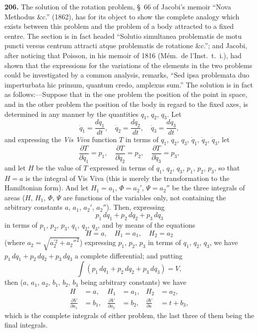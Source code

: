 \documentclass[11pt,a4paper]{book}
\begin{document}
\noindent\textbf{206.} The solution of the rotation problem, \S~66 of Jacobi's memoir ``Nova Methodus \&c.'' (1862), has for its object to show the complete analogy which exists between this problem and the problem of a body attracted to a fixed centre. The section is in fact headed ``Solutio simultanea problematis de motu puncti versus centrum attracti atque problematis de rotatione \&c.''; and Jacobi, after noticing that Poisson, in his memoir of 1816 (M\'{e}m.~de l'Inst.~t.~i.), had shown that the expressions for the variations of the elements in the two problems could be investigated by a common analysis, remarks, ``Sed ipsa problemata duo imperturbata hic primum, quantum credo, amplexus sum.'' The solution is in fact as follows:---Suppose that in the one problem the position of the point in space, and in the other problem the position of the body in regard to the fixed axes, is determined in any manner by the quantities $q_1$, $q_2$, $q_3$. Let
\[
\dot{q}_1 = \frac{dq_1}{dt},\quad \dot{q}_2 = \frac{dq_2}{dt},\quad \dot{q}_3 = \frac{dq_3}{dt},
\]
and expressing the \textit{Vis Viva} function $T$ in terms of $q_1$, $q_2$, $q_3$, $\dot{q}_1$, $\dot{q}_2$, $\dot{q}_3$, let
\[
\frac{\partial T}{\partial \dot{q}_1} = p_1,\quad \frac{\partial T}{\partial \dot{q}_2} = p_2,\quad \frac{\partial T}{\partial \dot{q}_3} = p_3,
\]
and let $H$ be the value of $T$ expressed in terms of $q_1$, $q_2$, $q_3$, $p_1$, $p_2$, $p_3$, so that $H = a$ is the integral of Vis Viva (this is merely the transformation to the Hamiltonian form). And let $H_1 = a_1$, $\Phi = a_2'$, $\Psi = a_2''$ be the three integrals of areas ($H$, $H_1$, $\Phi$, $\Psi$ are functions of the variables only, not containing the arbitrary constants $a$, $a_1$, $a_2'$, $a_2''$). Then, expressing
\[
p_1\,dq_1 + p_2\,dq_2 + p_3\,dq_3
\]
in terms of $p_1$, $p_2$, $p_3$, $q_1$, $q_2$, $q_3$, and by means of the equations
\[
H = a,\quad H_1 = a_1,\quad H_2 = a_2
\]
(where $a_2 = \sqrt{a_2^{'2} + a_2''^{2}}$) expressing $p_1$, $p_2$, $p_3$ in terms of $q_1$, $q_2$, $q_3$, we have $p_1\,dq_1 + p_2\,dq_2 + p_3\,dq_3$ a complete differential; and putting
\[
\int (p_1\,dq_1 + p_2\,dq_2 + p_3\,dq_3) = V,
\]
then ($a$, $a_1$, $a_2$, $b_1$, $b_2$, $b_3$ being arbitrary constants) we have
\begin{align*}
H &= a, & H_1 &= a_1, & H_2 &= a_2,\\
\frac{\partial V}{\partial a_1} &= b_1, & \frac{\partial V}{\partial a_2} &= b_2, & \frac{\partial V}{\partial a} &= t + b_3,
\end{align*}
which is the complete integrals of either problem, the last three of them being the final integrals.
\end{document}
